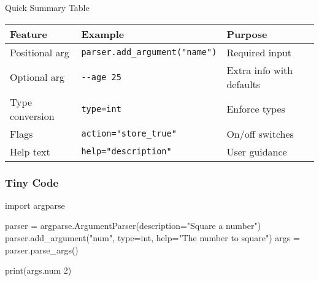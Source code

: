 \documentclass[
  letterpaper,
  DIV=11,
  numbers=noendperiod]{scrreprt}
\newenvironment{Shaded}{\begin{snugshade}}{\end{snugshade}}
\newcommand{\BuiltInTok}[1]{\textcolor[rgb]{0.00,0.23,0.31}{#1}}
\newcommand{\DecValTok}[1]{\textcolor[rgb]{0.68,0.00,0.00}{#1}}
\newcommand{\ImportTok}[1]{\textcolor[rgb]{0.00,0.46,0.62}{#1}}
\newcommand{\NormalTok}[1]{\textcolor[rgb]{0.00,0.23,0.31}{#1}}
\newcommand{\OperatorTok}[1]{\textcolor[rgb]{0.37,0.37,0.37}{#1}}
\newcommand{\StringTok}[1]{\textcolor[rgb]{0.13,0.47,0.30}{#1}}
\begin{document}
Quick Summary Table

\begin{longtable}[]{@{}
  >{\raggedright\arraybackslash}p{}
  >{\raggedright\arraybackslash}p{}
  >{\raggedright\arraybackslash}p{}@{}}
\toprule\noalign{}
\begin{minipage}[b]{\linewidth}\raggedright
Feature
\end{minipage} & \begin{minipage}[b]{\linewidth}\raggedright
Example
\end{minipage} & \begin{minipage}[b]{\linewidth}\raggedright
Purpose
\end{minipage} \\
\midrule\noalign{}
\endhead
\bottomrule\noalign{}
\endlastfoot
Positional arg & \texttt{parser.add\_argument("name")} & Required
input \\
Optional arg & \texttt{-\/-age\ 25} & Extra info with defaults \\
Type conversion & \texttt{type=int} & Enforce types \\
Flags & \texttt{action="store\_true"} & On/off switches \\
Help text & \texttt{help="description"} & User guidance \\
\end{longtable}

\subsubsection{Tiny Code}\label{tiny-code-96}

\begin{Shaded}
\begin{Highlighting}[]
\ImportTok{import}\NormalTok{ argparse}

\NormalTok{parser }\OperatorTok{=}\NormalTok{ argparse.ArgumentParser(description}\OperatorTok{=}\StringTok{"Square a number"}\NormalTok{)}
\NormalTok{parser.add\_argument(}\StringTok{"num"}\NormalTok{, }\BuiltInTok{type}\OperatorTok{=}\BuiltInTok{int}\NormalTok{, }\BuiltInTok{help}\OperatorTok{=}\StringTok{"The number to square"}\NormalTok{)}
\NormalTok{args }\OperatorTok{=}\NormalTok{ parser.parse\_args()}

\BuiltInTok{print}\NormalTok{(args.num  }\DecValTok{2}\NormalTok{)}
\end{Highlighting}
\end{Shaded}
\end{document}
